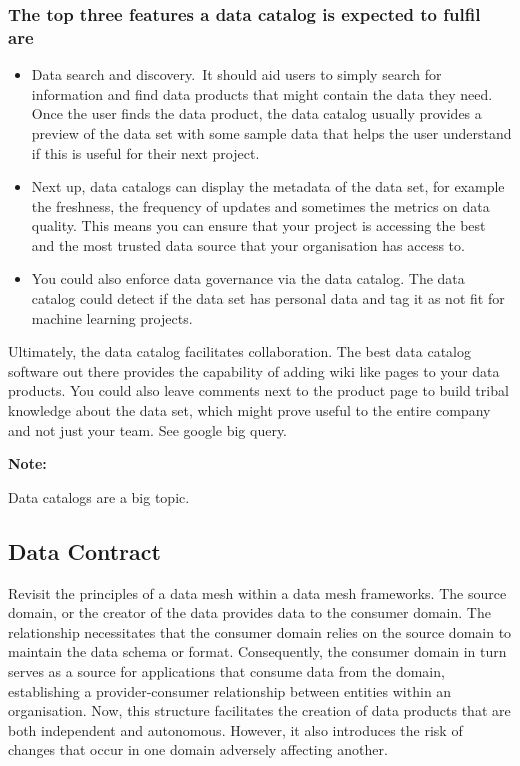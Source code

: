 \documentclass[a4paper, 11pt]{book}
\newenvironment{note}{
    \begin{siderule}
        \textbf{Note: }
        }{
    \end{siderule}}
\begin{document}
    \subsubsection{The top three features a data catalog is expected to fulfil are}
    \begin{itemize}
        \item Data search and discovery.\ It should aid users to simply search for information and find data products that might contain the data they need. Once the user finds the data product, the data catalog usually provides a preview of the data set with some sample data that helps the user understand if this is useful for their next project.
        \item Next up, data catalogs can display the metadata of the data set, for example the freshness, the frequency of updates and sometimes the metrics on data quality. This means you can ensure that your project is accessing the best and the most trusted data source that your organisation has access to.
        \item You could also enforce data governance via the data catalog. The data catalog could detect if the data set has personal data and tag it as not fit for machine learning projects.
    \end{itemize}

    Ultimately, the data catalog facilitates collaboration.
    The best data catalog software out there provides the capability of adding wiki like pages to your data products.
    You could also leave comments next to the product page to build tribal knowledge about the data set, which might prove useful to the entire company and not just your team.
    See google big query.

    \begin{note}
        Data catalogs are a big topic.
    \end{note}

    \subsection{Data Contract}
    Revisit the principles of a data mesh within a data mesh frameworks.
    The source domain, or the creator of the data provides data to the consumer domain.
    The relationship necessitates that the consumer domain relies on the source domain to maintain the data schema or format.
    Consequently, the consumer domain in turn serves as a source for applications that consume data from the domain, establishing a provider-consumer relationship between entities within an organisation.
    Now, this structure facilitates the creation of data products that are both independent and autonomous.
    However, it also introduces the risk of changes that occur in one domain adversely affecting another.
\end{document}

